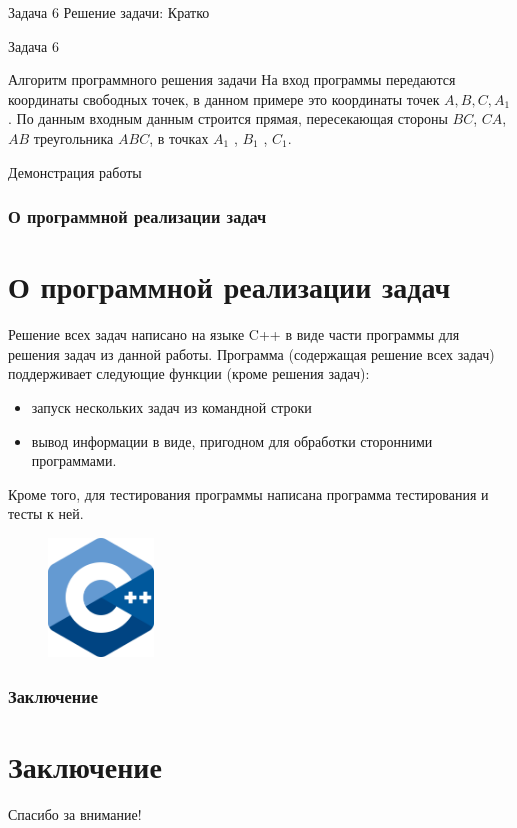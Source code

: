 \documentclass{beamer}
\newcommand\frametitleSpec[1]{%
\frametitle{#1}
\section{#1}%
}
\begin{document}
\begin{frame}
   \begin{block}{Задача 6}
      Решение задачи:
      Кратко
   \end{block}
\end{frame}

\begin{frame}
   \begin{block}{Задача 6}
      \begin{block}{Алгоритм программного решения задачи}
         На вход программы передаются координаты свободных точек, в данном примере это координаты точек \(A,B,C,A_1\). По данным входным данным строится прямая, пересекающая стороны \(BC\), \(CA\), \(AB\) треугольника \(ABC\), в точках \(A_1\) , \(B_1\) , \(C_1\).
      \end{block}
   \end{block}
\end{frame}

\begin{frame}
   Демонстрация работы
\end{frame}

\begin{frame}
   \frametitleSpec{О программной реализации задач}
   Решение всех задач написано на языке C++ в виде части программы для решения задач из данной работы.
   Программа (содержащая решение всех задач) поддерживает следующие функции (кроме решения задач):
   \begin{itemize}
      \item запуск нескольких задач из командной строки
      \item вывод информации в виде, пригодном для обработки сторонними программами.
   \end{itemize}
   Кроме того, для тестирования программы написана программа тестирования и тесты к ней.
   \begin{figure}[h]
      \centering
      \includegraphics[width=0.25\textwidth]{images/cpp-logo.png}
   \end{figure}
\end{frame}
\begin{frame}
   \frametitleSpec{Заключение}

\end{frame}
\begin{frame}
   \begin{center}
      {\huge Спасибо за внимание!}
   \end{center}
\end{frame}
\end{document}
